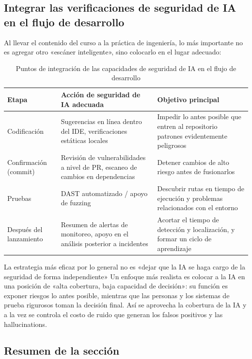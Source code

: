 \documentclass[a4paper]{article}
\begin{document}
\subsection{Integrar las verificaciones de seguridad de IA en el flujo de desarrollo}

Al llevar el contenido del curso a la práctica de ingeniería, lo más importante no es agregar otro «escáner inteligente», sino colocarlo en el lugar adecuado:

\begin{table}[H]
\centering
\begin{tabular}{p{} p{} p{}}
\toprule
Etapa & Acción de seguridad de IA adecuada & Objetivo principal \\
\midrule
Codificación & Sugerencias en línea dentro del IDE, verificaciones estáticas locales & Impedir lo antes posible que entren al repositorio patrones evidentemente peligrosos \\
Confirmación (commit) & Revisión de vulnerabilidades a nivel de PR, escaneo de cambios en dependencias & Detener cambios de alto riesgo antes de fusionarlos \\
Pruebas & DAST automatizado / apoyo de fuzzing & Descubrir rutas en tiempo de ejecución y problemas relacionados con el entorno \\
Después del lanzamiento & Resumen de alertas de monitoreo, apoyo en el análisis posterior a incidentes & Acortar el tiempo de detección y localización, y formar un ciclo de aprendizaje \\
\bottomrule
\end{tabular}
\caption{Puntos de integración de las capacidades de seguridad de IA en el flujo de desarrollo}
\end{table}

\begin{knowledgebox}{La estrategia más eficaz por lo general no es «dejar que la IA se haga cargo de la seguridad de forma independiente»}
Un enfoque más realista es colocar a la IA en una posición de «alta cobertura, baja capacidad de decisión»: su función es exponer riesgos lo antes posible, mientras que las personas y los sistemas de prueba rigurosos toman la decisión final. Así se aprovecha la cobertura de la IA y a la vez se controla el costo de ruido que generan los falsos positivos y las hallucinations.
\end{knowledgebox}

\subsection{Resumen de la sección}
\end{document}

